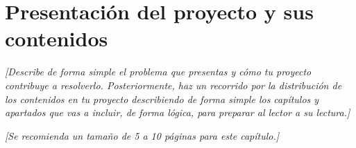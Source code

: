 
\section{Presentación del proyecto y sus contenidos}

\textit{[Describe de forma simple el problema que presentas y cómo tu proyecto contribuye a resolverlo. Posteriormente, haz un recorrido por la distribución de los contenidos en tu proyecto describiendo de forma simple los capítulos y apartados que vas a incluir, de forma lógica, para preparar al lector a su lectura.]}

\textit{[Se recomienda un tamaño de 5 a 10 páginas para este capítulo.]}
